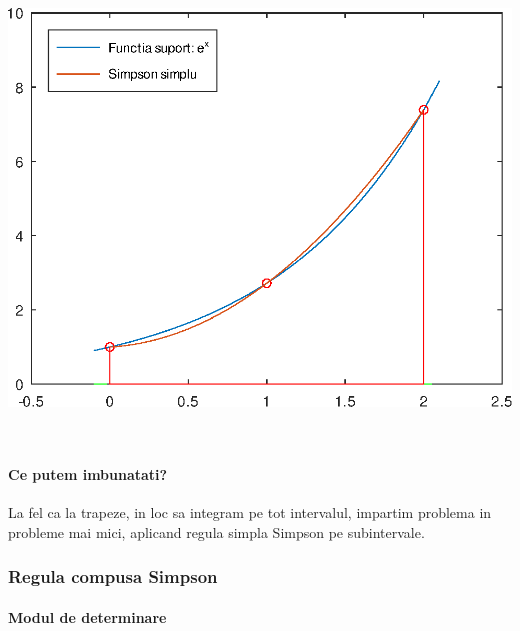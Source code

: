 \documentclass{article}
\begin{document}
\begin{minipage}{0.5\textwidth}
    \includegraphics[scale=0.4]{simpson_simplu_ex}
\end{minipage}\\

\paragraph{Ce putem imbunatati?}
\tabto{0.5cm} La fel ca la trapeze, in loc sa integram pe tot intervalul, impartim problema in probleme mai mici, aplicand regula simpla Simpson pe subintervale.


\subsubsection{Regula compusa Simpson}

\paragraph{Modul de determinare}
\end{document}

